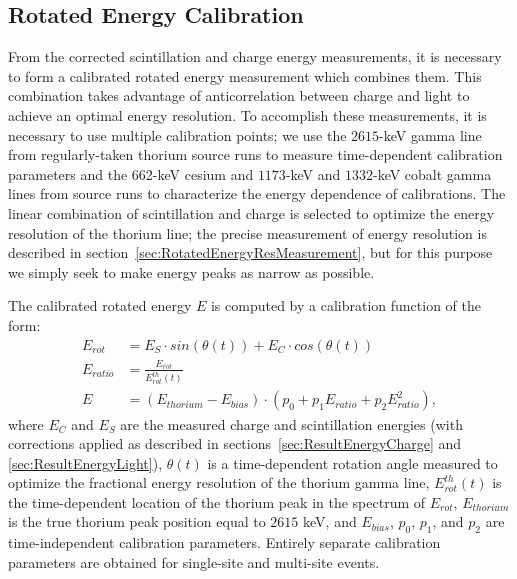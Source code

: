 \subsection{Rotated Energy Calibration}\label{sec:RotatedEnergyCalibration}

From the corrected scintillation and charge energy measurements, it is necessary to form a calibrated rotated energy measurement which combines them.  This combination takes advantage of anticorrelation between charge and light to achieve an optimal energy resolution.  To accomplish these measurements, it is necessary to use multiple calibration points; we use the $2615$-keV gamma line from regularly-taken thorium source runs to measure time-dependent calibration parameters and the 662-keV cesium and $1173$-keV and $1332$-keV cobalt gamma lines from source runs to characterize the energy dependence of calibrations.  The linear combination of scintillation and charge is selected to optimize the energy resolution of the thorium line; the precise measurement of energy resolution is described in section~\ref{sec:RotatedEnergyResMeasurement}, but for this purpose we simply seek to make energy peaks as narrow as possible.

The calibrated rotated energy $E$ is computed by a calibration function of the form:
\begin{subequations}\label{eqn:EnergyCalibrationParametrization}\begin{align}
E_{rot} &= E_S \cdot sin(\theta(t)) + E_C \cdot cos(\theta(t))\\
E_{ratio} &= \frac{E_{rot}}{E^{th}_{rot}(t)}\\
E &= \left( E_{thorium} - E_{bias} \right) \cdot \left( p_0 + p_1 E_{ratio} + p_2 E_{ratio}^2\right),
\end{align}\end{subequations}
where $E_C$ and $E_S$ are the measured charge and scintillation energies (with corrections applied as described in sections~\ref{sec:ResultEnergyCharge} and \ref{sec:ResultEnergyLight}), $\theta(t)$ is a time-dependent rotation angle measured to optimize the fractional energy resolution of the thorium gamma line, $E^{th}_{rot}(t)$ is the time-dependent location of the thorium peak in the spectrum of $E_{rot}$, $E_{thorium}$ is the true thorium peak position equal to $2615$ keV, and $E_{bias}$, $p_0$, $p_1$, and $p_2$ are time-independent calibration parameters.  Entirely separate calibration parameters are obtained for single-site and multi-site events.


